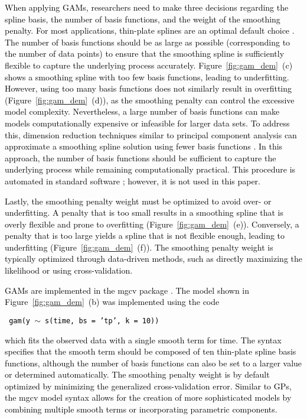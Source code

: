 \documentclass[man, floatsintext]{apa7}
\begin{document}
\textcolor{black}{
  When applying GAMs, researchers need to make three decisions regarding the
  spline basis, the number of basis functions, and the weight of the smoothing
  penalty. For most applications, thin-plate splines are an optimal default
  choice \parencite{wood_generalized_2006}. The number of basis functions
  should be as large as possible (corresponding to the number of data points)
  to ensure that the smoothing spline is sufficiently flexible to capture the
  underlying process accurately. Figure~\ref{fig:gam_dem}~(c) shows a smoothing
  spline with too few basis functions, leading to underfitting. However, using
  too many basis functions does not similarly result in overfitting
  (Figure~\ref{fig:gam_dem}~(d)), as the smoothing penalty can control the
  excessive model complexity. Nevertheless, a large number of basis functions
  can make models computationally expensive or infeasible for larger data sets.
  To address this, dimension reduction techniques similar to principal
  component analysis can approximate a smoothing spline solution using fewer
  basis functions \parencite{wood_thin_2003}. In this approach, the number of
  basis functions should be sufficient to capture the underlying process while
  remaining computationally practical. This procedure is automated in standard
  software \parencite{R-mgcv_a}; however, it is not used in this paper.}

\textcolor{black}{
  Lastly, the smoothing penalty weight must be optimized to avoid over- or
  underfitting. A penalty that is too small results in a smoothing spline that
  is overly flexible and prone to overfitting (Figure~\ref{fig:gam_dem}~(e)).
  Conversely, a penalty that is too large yields a spline that is not flexible
  enough, leading to underfitting (Figure~\ref{fig:gam_dem}~(f)). The smoothing
  penalty weight is typically optimized through data-driven methods, such as
  directly maximizing the likelihood or using cross-validation.
}

\textcolor{black}{ GAMs are implemented in the mgcv package
  \parencite{R-mgcv_a}. The model shown in Figure~\ref{fig:gam_dem}~(b) was
  implemented using the code}

\noindent
\textcolor{black}{\fontsize{10}{12}\selectfont\texttt{ gam(y $\sim$
    s(time, bs = 'tp', k = 10)) }}

\noindent\textcolor{black}{which fits the observed data with a single
  smooth term for time. The syntax specifies that the smooth term should be
  composed of ten thin-plate spline basis functions, although the number of
  basis functions can also be set to a larger value or determined
  automatically. The smoothing penalty weight is by default optimized
  by minimizing the generalized cross-validation error. Similar to GPs, the
  mgcv model syntax allows for the creation of more sophisticated models by
  combining multiple smooth terms or incorporating parametric components. }
\end{document}
